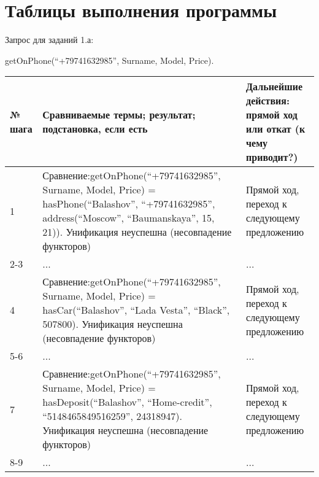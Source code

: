 \documentclass[14pt,a4paper]{scrreprt}
\begin{document}
\section{Таблицы выполнения программы}

Запрос для заданий 1.а:

getOnPhone(``+79741632985'', Surname, Model, Price).

\begin{table}[H]
	\begin{tabular}{|p{1.2cm\small}|p{9cm\small}|p{5cm\small}|}	
		\hline
		№ шага & Сравниваемые термы; результат; подстановка, если есть & Дальнейшие действия: прямой ход или откат (к чему приводит?)\\
		\hline
		1 & Сравнение:\linebreak getOnPhone(``+79741632985'', Surname, Model, Price) = hasPhone(``Balashov'', ``+79741632985'', address(``Moscow'', ``Baumanskaya'', 15, 21)). Унификация неуспешна (несовпадение функторов) & Прямой ход, переход к следующему предложению\\
		\hline
		2-3 & ... & ...\\
		\hline
		4 & Сравнение:\linebreak getOnPhone(``+79741632985'', Surname, Model, Price) = hasCar(``Balashov'', ``Lada Vesta'', ``Black'', 507800). Унификация неуспешна (несовпадение функторов) & Прямой ход, переход к следующему предложению\\
		\hline
		5-6 & ... & ... \\
		\hline
		7 & Сравнение:\linebreak getOnPhone(``+79741632985'', Surname, Model, Price) = hasDeposit(``Balashov'', ``Home-credit'', ``5148465849516259'', 24318947). Унификация неуспешна (несовпадение функторов) & Прямой ход, переход к следующему предложению\\
		\hline
		8-9 & ... & ... \\
		\hline
	\end{tabular}
\end{table}
\end{document}
